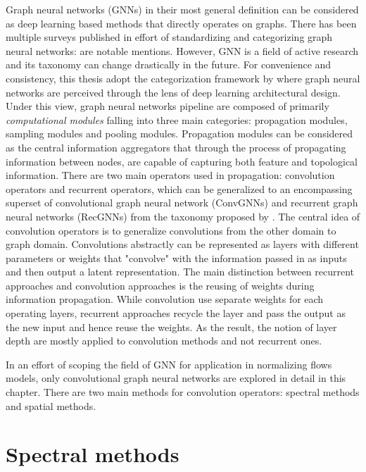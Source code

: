 Graph neural networks (GNNs) in their most general definition can be considered as deep learning based methods that directly operates on graphs. There has been multiple surveys published in effort of standardizing and categorizing graph neural networks: \cite{zhangdeeplearninggraphs2020} \cite{zhangdeeplearninggraphs2020} \cite{chamiMachineLearningGraphs2022} are notable mentions. However, GNN is a field of active research and its taxonomy can change drastically in the future. For convenience and consistency, this thesis adopt the categorization framework by \cite{zhangdeeplearninggraphs2020} where graph neural networks are perceived through the lens of deep learning architectural design. Under this view, graph neural networks pipeline are composed of primarily \textit{computational modules} falling into three main categories: propagation modules, sampling modules and pooling modules. Propagation modules can be considered as the central information aggregators that through the process of propagating information between nodes, are capable of capturing both feature and topological information. There are two main operators used in propagation: convolution operators and recurrent operators, which can be generalized to an encompassing superset of convolutional graph neural network (ConvGNNs) and recurrent graph neural networks (RecGNNs) from the taxonomy proposed by \cite{wuComprehensiveSurveyGraph2021}. The central idea of convolution operators is to generalize convolutions from the other domain to graph domain. Convolutions abstractly can be represented as layers with different parameters or weights that "convolve" with the information passed in as inputs and then output a latent representation. The main distinction between recurrent approaches and convolution approaches is the reusing of weights during information propagation. While convolution use separate weights for each operating layers, recurrent approaches recycle the layer and pass the output as the new input and hence reuse the weights. As the result, the notion of layer depth are mostly applied to convolution methods and not recurrent ones.

In an effort of scoping the field of GNN for application in normalizing flows models, only convolutional graph neural networks are explored in detail in this chapter. There are two main methods for convolution operators: spectral methods and spatial methods.

\section{Spectral methods}
